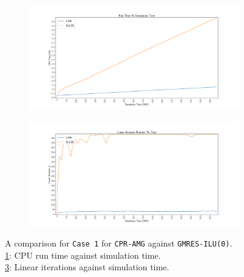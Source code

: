 \begin{figure}
\centering
\begin{subfigure}[b]{\textwidth}
   \includegraphics[width=1\linewidth]{figures/case1/cpu_time.pdf}
   \caption{}
   \label{case1_cpu}
\end{subfigure}

\begin{subfigure}[b]{\textwidth}
   \includegraphics[width=1\linewidth]{figures/case1/its_time.pdf}
   \caption{}
   \label{case1_its}
\end{subfigure}

\caption[caption]{A comparison for \texttt{Case 1} for \texttt{CPR-AMG} against \texttt{GMRES-ILU(0)}.\\\hspace{\textwidth}
	\cref{case1_cpu}: CPU run time against simulation time. \\\hspace{\textwidth}
	\cref{case1_its}: Linear iterations against simulation time.\\\hspace{\textwidth}}
\end{figure}

